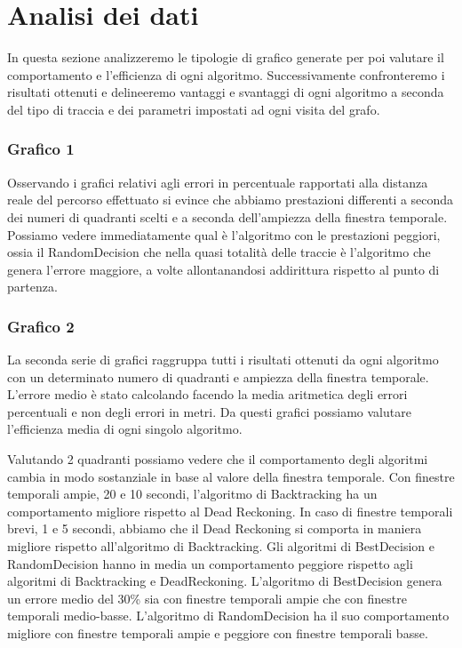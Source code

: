 \documentclass[12pt,a4paper,openright,twoside]{report}
\begin{document}
\section{Analisi dei dati}
In questa sezione analizzeremo le tipologie di grafico generate per poi valutare il comportamento e l'efficienza di ogni algoritmo. Successivamente confronteremo i risultati ottenuti e delineeremo vantaggi e svantaggi di ogni algoritmo a seconda del tipo di traccia e dei parametri impostati ad ogni visita del grafo.

\subsubsection{Grafico 1}
Osservando i grafici relativi agli errori in percentuale rapportati alla distanza reale del percorso effettuato si evince che abbiamo prestazioni differenti a seconda dei numeri di quadranti scelti e a seconda dell'ampiezza della finestra temporale.
Possiamo vedere immediatamente qual è l'algoritmo con le prestazioni peggiori, ossia il RandomDecision che nella quasi totalità delle traccie è l'algoritmo che genera l'errore maggiore, a volte allontanandosi addirittura rispetto al punto di partenza.

\subsubsection{Grafico 2}
La seconda serie di grafici raggruppa tutti i risultati ottenuti da ogni algoritmo con un determinato numero di quadranti e ampiezza della finestra temporale. L'errore medio è stato calcolando facendo la media aritmetica degli errori percentuali e non degli errori in metri.
Da questi grafici possiamo valutare l'efficienza media di ogni singolo algoritmo.

Valutando 2 quadranti possiamo vedere che il comportamento degli algoritmi cambia in modo sostanziale in base al valore della finestra temporale. Con finestre temporali ampie, 20 e 10 secondi, l'algoritmo di Backtracking ha un comportamento migliore rispetto al Dead Reckoning. In caso di finestre temporali brevi, 1 e 5 secondi, abbiamo che il Dead Reckoning si comporta in maniera migliore rispetto all'algoritmo di Backtracking.
Gli algoritmi di BestDecision e RandomDecision hanno in media un comportamento peggiore rispetto agli algoritmi di Backtracking e DeadReckoning. L'algoritmo di BestDecision genera un errore medio del 30\% sia con finestre temporali ampie che con finestre temporali medio-basse. L'algoritmo di RandomDecision ha il suo comportamento migliore con finestre temporali ampie e peggiore con finestre temporali basse.
\end{document}
